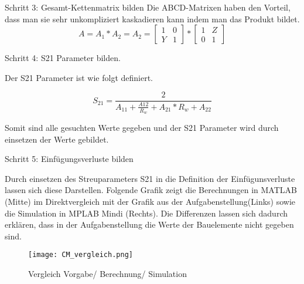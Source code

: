 Schritt 3: Gesamt-Kettenmatrix bilden
Die ABCD-Matrixen haben den Vorteil, dass man sie sehr unkompliziert kaskadieren kann indem man das Produkt bildet.
\begin{equation}
A = A_1*A_2 = A_2 = \left[\begin{matrix}
1 & 0\\ Y&1 
\end{matrix}\right] * 
\left[\begin{matrix}
1 & Z\\ 0&1 
\end{matrix} \right]
\end{equation}

Schritt 4: S21 Parameter bilden.

Der S21 Parameter ist wie folgt definiert.

\begin{equation}\label{equ:def_s21_aparams}
S_{21} = \frac{2}{A_{11}+\frac{A{12}}{R_w}+A_{21}*R_w+A_{22}}
\end{equation}

Somit sind alle gesuchten Werte gegeben und der S21 Parameter wird durch einsetzen der Werte gebildet.

Schritt 5: Einfügungsverluste bilden

Durch einsetzen des Streuparameters S21 in die Definition der Einfügunsverluste lassen sich diese Darstellen. Folgende Grafik zeigt die Berechnungen in MATLAB (Mitte) im Direktvergleich mit der Grafik aus der Aufgabenstellung(Links) sowie die Simulation in MPLAB Mindi (Rechts). Die Differenzen lassen sich dadurch erklären, dass in der Aufgabenstellung die Werte der Bauelemente nicht gegeben sind.
\begin{figure}[H]
	\centering
	\texttt{[image: CM\_vergleich.png]}
	\caption{Vergleich Vorgabe/ Berechnung/ Simulation}
	\label{fig:Vergleich Berechnung Simulation}
\end{figure}
